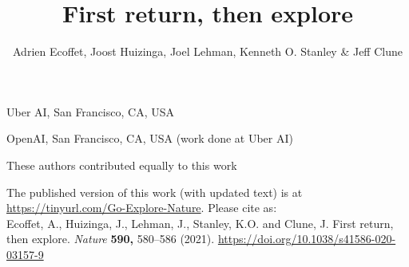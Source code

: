 \documentclass{nature}
\title{First return, then explore}
\author{Adrien Ecoffet, Joost Huizinga, Joel Lehman, Kenneth O. Stanley \& Jeff Clune}
\begin{document}
\maketitle

\begin{affiliations}
 \item Uber AI, San Francisco, CA, USA
 \item OpenAI, San Francisco, CA, USA (work done at Uber AI)

 These authors contributed equally to this work
\end{affiliations}

\vspace{-3mm}
\noindent
The published version of this work (with updated text) is at \href{https://tinyurl.com/Go-Explore-Nature}{https://tinyurl.com/Go-Explore-Nature}. Please cite as:\\
Ecoffet, A., Huizinga, J., Lehman, J., Stanley, K.O. and Clune, J. First return, then explore. \emph{Nature} \textbf{590,} 580–586 (2021). \href{https://doi.org/10.1038/s41586-020-03157-9}{https://doi.org/10.1038/s41586-020-03157-9}
\vspace{5mm}

\ifarxiv
\else
\linenumbers
\fi
\end{document}
